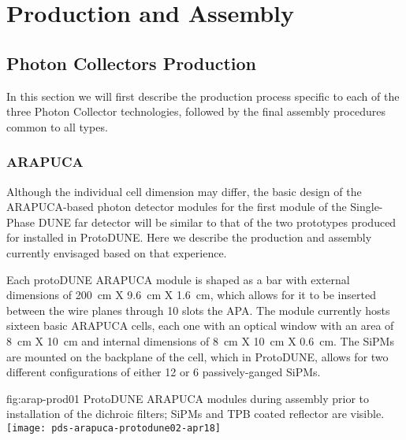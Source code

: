 \section{Production and Assembly}
\label{sec:fdsp-pd-prod-assy}

\subsection{Photon Collectors Production}
\label{sec:fdsp-pd-prod-pc}

In this section we will first describe the production process specific to each of the three Photon Collector technologies, followed by the final assembly procedures common to all types. 

\subsubsection{ARAPUCA}
\label{ssec:fdsp-pd-pc-prod-arapuca}
Although the individual cell dimension may differ, the basic design of the ARAPUCA-based photon detector modules for the first module of the Single-Phase DUNE far detector will be similar to that of the two prototypes produced for installed in ProtoDUNE. Here we describe the production and assembly currently envisaged based on that experience.

Each protoDUNE ARAPUCA module is shaped as a bar with external dimensions of 
\SI{200}{cm} X \SI{9.6}{cm} X \SI{1.6}{cm}, which allows for it to be inserted between the wire planes through 10 slots the APA. The module currently hosts sixteen basic ARAPUCA cells, each one with an optical window with an area of \SI{8}{cm} X \SI{10}{cm} and internal dimensions of \SI{8}{cm} X \SI{10}{cm} X \SI{0.6}{cm}. The SiPMs are mounted on the backplane of the cell, which in ProtoDUNE, allows for  two different configurations of either 12 or 6 passively-ganged SiPMs.

\begin{dunefigure}{fig:arap-prod01}
{ProtoDUNE ARAPUCA modules during assembly prior to installation of the dichroic filters; SiPMs and TPB coated reflector are visible.}
  \texttt{[image: pds-arapuca-protodune02-apr18]}
\end{dunefigure}


